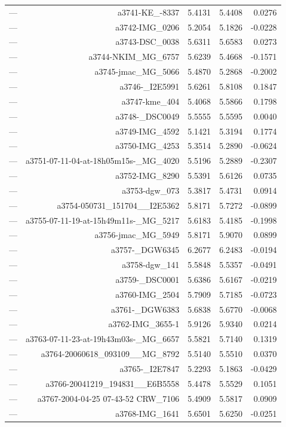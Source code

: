 \begin{table}[htbp]
\begin{tabular}{lrrrr}
— & a3741-KE_-8337 & 5.4131 & 5.4408 & 0.0276 \\
— & a3742-IMG_0206 & 5.2054 & 5.1826 & -0.0228 \\
— & a3743-DSC_0038 & 5.6311 & 5.6583 & 0.0273 \\
— & a3744-NKIM_MG_6757 & 5.6239 & 5.4668 & -0.1571 \\
— & a3745-jmac_MG_5066 & 5.4870 & 5.2868 & -0.2002 \\
— & a3746-_I2E5991 & 5.6261 & 5.8108 & 0.1847 \\
— & a3747-kme_404 & 5.4068 & 5.5866 & 0.1798 \\
— & a3748-_DSC0049 & 5.5555 & 5.5595 & 0.0040 \\
— & a3749-IMG_4592 & 5.1421 & 5.3194 & 0.1774 \\
— & a3750-IMG_4253 & 5.3514 & 5.2890 & -0.0624 \\
— & a3751-07-11-04-at-18h05m15s-_MG_4020 & 5.5196 & 5.2889 & -0.2307 \\
— & a3752-IMG_8290 & 5.5391 & 5.6126 & 0.0735 \\
— & a3753-dgw_073 & 5.3817 & 5.4731 & 0.0914 \\
— & a3754-050731_151704__I2E5362 & 5.8171 & 5.7272 & -0.0899 \\
— & a3755-07-11-19-at-15h49m11s-_MG_5217 & 5.6183 & 5.4185 & -0.1998 \\
— & a3756-jmac_MG_5949 & 5.8171 & 5.9070 & 0.0899 \\
— & a3757-_DGW6345 & 6.2677 & 6.2483 & -0.0194 \\
— & a3758-dgw_141 & 5.5848 & 5.5357 & -0.0491 \\
— & a3759-_DSC0001 & 5.6386 & 5.6167 & -0.0219 \\
— & a3760-IMG_2504 & 5.7909 & 5.7185 & -0.0723 \\
— & a3761-_DGW6383 & 5.6838 & 5.6770 & -0.0068 \\
— & a3762-IMG_3655-1 & 5.9126 & 5.9340 & 0.0214 \\
— & a3763-07-11-23-at-19h43m03s-_MG_6657 & 5.5821 & 5.7140 & 0.1319 \\
— & a3764-20060618_093109__MG_8792 & 5.5140 & 5.5510 & 0.0370 \\
— & a3765-_I2E7847 & 5.2293 & 5.1863 & -0.0429 \\
— & a3766-20041219_194831__E6B5558 & 5.4478 & 5.5529 & 0.1051 \\
— & a3767-2004-04-25 07-43-52 CRW_7106 & 5.4909 & 5.5817 & 0.0909 \\
— & a3768-IMG_1641 & 5.6501 & 5.6250 & -0.0251 \\

\end{tabular}
\end{table}

